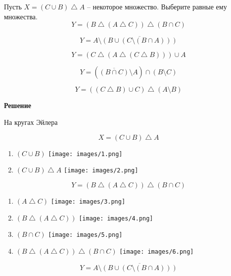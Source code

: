 \documentclass{article}
\begin{document}
Пусть $X=(C \cup B) \bigtriangleup A$ – некоторое множество. Выберите равные ему множества.
$$Y = (B \bigtriangleup (A \bigtriangleup C)) \bigtriangleup (B \cap C)$$ 

$$Y = A \setminus \overline{(B \cup (C \setminus (B \cap A)))}$$

$$Y = (C \bigtriangleup (A \bigtriangleup (C \bigtriangleup B))) \cup A$$

$$Y = (\overline{(B \cap C)} \setminus A) \cap (B \setminus C)$$

$$Y = ((C \bigtriangleup B) \cup C) \bigtriangleup (A \setminus B)$$


\textbf{Решение}

На кругах Эйлера

$$X=(C \cup B) \bigtriangleup A$$

\begin{enumerate}
    \item $(C \cup B)$
    \texttt{[image: images/1.png]}
    
    \item $(C \cup B) \bigtriangleup A$
    \texttt{[image: images/2.png]}
\end{enumerate}

\noindent\makebox[\linewidth]{\rule{\paperwidth}{0.4pt}}

$$Y = (B \bigtriangleup (A \bigtriangleup C)) \bigtriangleup (B \cap C)$$ 

\begin{enumerate}
    \item $(A \bigtriangleup C)$
    \texttt{[image: images/3.png]}
    
    \item $(B \bigtriangleup (A \bigtriangleup C))$
    \texttt{[image: images/4.png]}
    
    \item $(B \cap C)$
    \texttt{[image: images/5.png]}
    
    \item $(B \bigtriangleup (A \bigtriangleup C)) \bigtriangleup (B \cap C)$
    \texttt{[image: images/6.png]}
\end{enumerate}

\noindent\makebox[\linewidth]{\rule{\paperwidth}{0.4pt}}

$$Y = A \setminus \overline{(B \cup (C \setminus (B \cap A)))}$$
\end{document}
